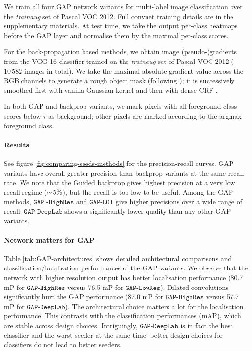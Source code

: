 \documentclass[british,10pt,twocolumn,letterpaper]{article}
\begin{document}
 We train all four GAP network variants for multi-label image classification
 over the \emph{trainaug} set of Pascal VOC 2012. Full convnet training
 details are in the supplementary materials. At test time, we take
 the output per-class heatmaps before the GAP layer and normalise them
 by the maximal per-class scores. 
 
 For the back-propagation based methods, we obtain image (pseudo-)gradients
 from the VGG-16 \cite{Simonyan2015Iclr} classifier trained on the
 \emph{trainaug} set of Pascal VOC 2012 ($10\,582$ images in total).
 We take the maximal absolute gradient value across the RGB channels
 to generate a rough object mask (following \cite{Simonyan2014Iclr});
 it is successively smoothed first with vanilla Gaussian kernel and
 then with dense CRF \cite{Kraehenbuehl2011Nips}. 
 
 In both GAP and backprop variants, we mark pixels with all foreground
 class scores below $\tau$ as background; other pixels are marked
 according to the argmax foreground class.
 
 \paragraph{Results}
 
 See figure \ref{fig:comparing-seeds-methods} for the precision-recall
 curves. GAP variants have overall greater precision than backprop
 variants at the same recall rate. We note that the Guided backprop
 gives highest precision at a very low recall regime ($\sim\negthinspace5\%$),
 but the recall is too low to be useful. Among the GAP methods, $\mathtt{GAP}\text{     -}\mathtt{HighRes}$
 and $\mathtt{GAP}\text{-}\mathtt{ROI}$ give higher precisions over
 a wide range of recall. $\mathtt{GAP}\text{-}\mathtt{DeepLab}$ shows
 a significantly lower quality than any other GAP variants.
 
 
 \paragraph{Network matters for GAP}

 Table \ref{tab:GAP-architectures} shows detailed architectural comparisons
 and classification/localisation performances of the GAP variants.
 We observe that the network with higher resolution output has better
 localisation performance (80.7 mP for $\mathtt{GAP}\text{-}\mathtt{HighRes}$
 versus 76.5 mP for $\mathtt{GAP}\text{-}\mathtt{LowRes}$). Dilated
 convolutions significantly hurt the GAP performance (87.0 mP for $\mathtt{GAP}\text{-}\mathtt{HighRes}$
 versus 57.7 mP for $\mathtt{GAP}\text{-}\mathtt{DeepLab}$).  The
 architectural choice matters a lot for the localisation performance.
 This contrasts with the classification performances (mAP), which are
 stable across design choices. Intriguingly, $\mathtt{GAP}\text{-}\mathtt{DeepLab}$
 is in fact the best classifier and the worst seeder at the same time;
 better design choices for classifiers do not lead to better seeders. 
 
\end{document}
